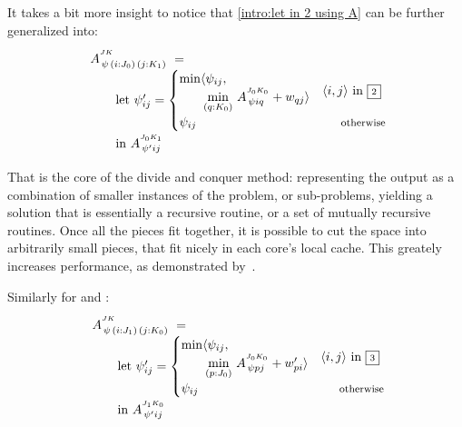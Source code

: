 \medskip
It takes a bit more insight to notice that \eqref{intro:let in 2 using A} can be further
generalized into:
%
\begin{equation}\LeftEqNo
\renewcommand\arraystretch{1.5}
\begin{array}{l@{}l}
	A^{^{JK}}_{\,\psi\,(i : J_0)\,(j : K_1)} ~=~ \\
	\qquad
	\textrm{let}~\psi'_{ij} = \begin{cases}
	  \begin{array}{@{}l@{}l@{}}\min\langle & \psi_{ij}, \\ & \!\underset{(q:K_0)}\min ~ A^{^{J_0K_0}}_{\,\psi iq} + w_{qj}\rangle\end{array} & \langle i,j\rangle\mbox{ in }\qbox2 \\
	  \psi_{ij} & \otherwise
	\end{cases} \\
	\qquad\textrm{in}~
	A^{^{J_0K_1}}_{\,\psi' ij}
\end{array}
\label{intro:let in A 2}
\end{equation}

That is the core of the divide and conquer method: representing the output as a combination
of smaller instances of the problem, or sub-problems, yielding a solution that is essentially
a recursive routine, or a set of mutually recursive routines. 
Once all the pieces fit together, it is possible to cut the space into arbitrarily small pieces,
that fit nicely in each core's local cache. This greately increases performance, as demonstrated
by~. 

\medskip
Similarly for  and :
%
\begin{equation}\LeftEqNo
\renewcommand\arraystretch{1.5}
\begin{array}{l@{}l}
	A^{^{JK}}_{\,\psi\,(i : J_1)\,(j : K_0)} ~=~ \\
	\qquad
	\textrm{let}~\psi'_{ij} = \begin{cases} 
	  \begin{array}{@{}l@{}l@{}}\min\langle & \psi_{ij}, \\ & \!\underset{(p:J_0)}\min ~ A^{^{J_0K_0}}_{\,\psi pj} + w'_{pi}\rangle \end{array} & \langle i,j\rangle\mbox{ in }\qbox3 \\
	  \psi_{ij} & \otherwise \\
	\end{cases} \\
	\qquad\textrm{in}~
	A^{^{J_1K_0}}_{\,\psi' ij}
\end{array}
\label{intro:let in A 3}
\end{equation}

